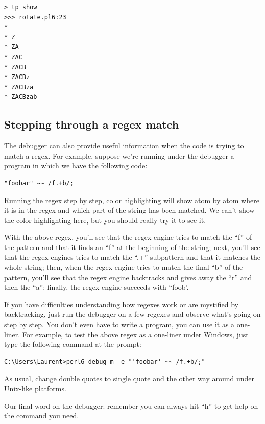 \begin{verbatim}
> tp show
>>> rotate.pl6:23
*
* Z
* ZA
* ZAC
* ZACB
* ZACBz
* ZACBza
* ZACBzab
\end{verbatim}

\subsection{Stepping through a regex match}
\label{regex-debugging}
The debugger can also provide useful information when the 
code is trying to match a regex. For example, suppose we're 
running under the debugger a program in which we have the 
following code:

\begin{verbatim}
"foobar" ~~ /f.+b/;
\end{verbatim}

Running the regex step by step, color highlighting will show 
atom by atom where it is in the regex and which part of the 
string has been matched. We can't show the color highlighting 
here, but you should really try it to see it.

With the above regex, you'll see that 
the regex engine tries to match the ``f'' of the pattern and that 
it finds an ``f'' at the beginning of the string; next, you'll see 
that the regex engines tries to match the ``.+'' subpattern and 
that it matches the whole string; then, when the regex engine 
tries to match the final ``b'' of the pattern, you'll see that 
the regex engine backtracks and gives away the ``r'' and then the 
``a''; finally, the regex engine succeeds with ``foob'.

If you have difficulties understanding how regexes work or are 
mystified by backtracking, just run the debugger on a few 
regexes and observe what's going on step by step. You don't 
even have to write a program, you can use it as a one-liner. 
For example, to test the above regex as a one-liner under  
Windows, just type the following command at the prompt:

\begin{verbatim}
C:\Users\Laurent>perl6-debug-m -e "'foobar' ~~ /f.+b/;"
\end{verbatim}

As usual, change double quotes to single quote and the other 
way around under Unix-like platforms.

Our final word on the debugger: remember you can always hit 
``h'' to get help on the command you need. 


